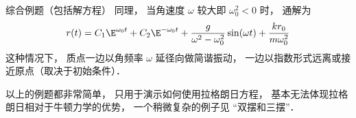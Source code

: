 \begin{example}{综合例题（包括解方程）}
同理， 当角速度 $\omega$ 较大即 $\omega_0^2 < 0$ 时， 通解为
\begin{equation}
r(t) = C_1 \E^{\omega_0 t} + C_2 \E^{-\omega_0 t} + \frac{g}{\omega^2 - \omega_0^2} \sin(\omega t) + \frac{k r_0}{m \omega_0^2}
\end{equation}
这种情况下， 质点一边以角频率 $\omega$ 延径向做简谐振动， 一边以指数形式远离或接近原点（取决于初始条件）．
\end{example}

以上的例题都非常简单， 只用于演示如何使用拉格朗日方程， 基本无法体现拉格朗日相对于牛顿力学的优势， 一个稍微复杂的例子见 “双摆和三摆”．


